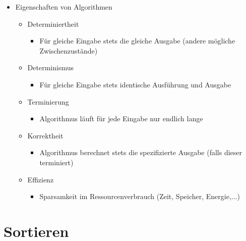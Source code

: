 \begin{itemize}
    \item Eigenschaften von Algorithmen
        \begin{itemize}
	    	\item Determiniertheit
	    		\begin{itemize}
	    			\item Für gleiche Eingabe stets die gleiche Ausgabe (andere mögliche Zwischenzustände)
	    		\end{itemize}
	    	\item Determinismus
	    		\begin{itemize}
	    			\item Für gleiche Eingabe stets identische Ausführung und Ausgabe
	    		\end{itemize}
	    	\item Terminierung
	    		\begin{itemize}
	    			\item Algorithmus läuft für jede Eingabe nur endlich lange
	    		\end{itemize}
	    	\item Korrektheit
	    		\begin{itemize}
	    			\item Algorithmus berechnet stets die spezifizierte Ausgabe (falls dieser terminiert)
	    		\end{itemize}
	    	\item Effizienz
	    		\begin{itemize}
	    			\item Sparsamkeit im Ressourcenverbrauch (Zeit, Speicher, Energie,...)
	    		\end{itemize}
	    \end{itemize}
\end{itemize}

\pagebreak

\section{Sortieren}
